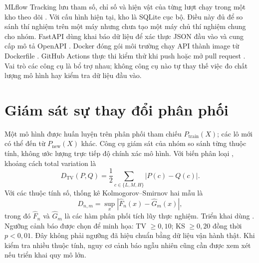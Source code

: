 MLflow Tracking lưu tham số, chỉ số và hiện vật của từng lượt chạy trong một kho theo dõi \cite{mlflow}. Với cấu hình hiện tại, kho là SQLite cục bộ. Điều này đủ để so sánh thí nghiệm trên một máy nhưng chưa tạo một máy chủ thí nghiệm chung cho nhóm. FastAPI dùng khai báo dữ liệu để xác thực JSON đầu vào và cung cấp mô tả OpenAPI \cite{fastapi}. Docker đóng gói môi trường chạy API thành image từ Dockerfile \cite{docker}. GitHub Actions thực thi kiểm thử khi push hoặc mở pull request \cite{actions}. Vai trò các công cụ là bổ trợ nhau; không công cụ nào tự thay thế việc đo chất lượng mô hình hay kiểm tra dữ liệu đầu vào.

\section{Giám sát sự thay đổi phân phối}
Một mô hình được huấn luyện trên phân phối tham chiếu $P_{\mathrm{train}}(X)$; các lô mới có thể đến từ $P_{\mathrm{new}}(X)$ khác. Công cụ giám sát của nhóm so sánh từng thuộc tính, không ước lượng trực tiếp độ chính xác mô hình. Với biến phân loại , khoảng cách total variation là
\begin{equation}
D_{\mathrm{TV}}(P,Q)=\frac{1}{2}\sum_{c\in\{L,M,H\}}|P(c)-Q(c)|.
\end{equation}
Với các thuộc tính số, thống kê Kolmogorov--Smirnov hai mẫu là
\begin{equation}
D_{n,m}=\sup_x\left|\widehat F_n(x)-\widehat G_m(x)\right|,
\end{equation}
trong đó $\widehat F_n$ và $\widehat G_m$ là các hàm phân phối tích lũy thực nghiệm. Triển khai dùng  \cite{scipyks}. Ngưỡng cảnh báo được chọn để minh họa: TV $\geq0,10$; KS $\geq0,20$ đồng thời $p<0,01$. Đây không phải ngưỡng đã hiệu chuẩn bằng dữ liệu vận hành thật. Khi kiểm tra nhiều thuộc tính, nguy cơ cảnh báo ngẫu nhiên cũng cần được xem xét nếu triển khai quy mô lớn.

